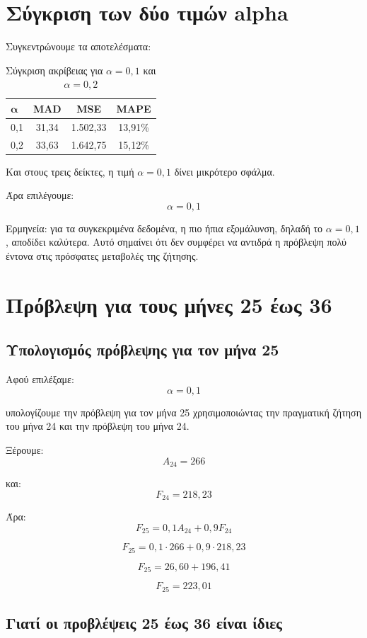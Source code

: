 \documentclass[12pt,a4paper]{article}
\begin{document}
\section{Σύγκριση των δύο τιμών alpha}

Συγκεντρώνουμε τα αποτελέσματα:

\begin{table}[H]
\centering
\caption{Σύγκριση ακρίβειας για \(\alpha=0{,}1\) και \(\alpha=0{,}2\)}
\begin{tabular}{lccc}
\toprule
\(\boldsymbol{\alpha}\) & \textbf{MAD} & \textbf{MSE} & \textbf{MAPE} \\
\midrule
0,1 & 31,34 & 1.502,33 & 13,91\% \\
0,2 & 33,63 & 1.642,75 & 15,12\% \\
\bottomrule
\end{tabular}
\end{table}

Και στους τρεις δείκτες, η τιμή \(\alpha=0{,}1\) δίνει μικρότερο σφάλμα.

Άρα επιλέγουμε:
\[
\boxed{\alpha=0{,}1}
\]

Ερμηνεία: για τα συγκεκριμένα δεδομένα, η πιο ήπια εξομάλυνση, δηλαδή το \(\alpha=0{,}1\), αποδίδει καλύτερα. Αυτό σημαίνει ότι δεν συμφέρει να αντιδρά η πρόβλεψη πολύ έντονα στις πρόσφατες μεταβολές της ζήτησης.

\section{Πρόβλεψη για τους μήνες 25 έως 36}

\subsection{Υπολογισμός πρόβλεψης για τον μήνα 25}

Αφού επιλέξαμε:
\[
\alpha=0{,}1
\]

υπολογίζουμε την πρόβλεψη για τον μήνα 25 χρησιμοποιώντας την πραγματική ζήτηση του μήνα 24 και την πρόβλεψη του μήνα 24.

Ξέρουμε:
\[
A_{24}=266
\]

και:
\[
F_{24}=218{,}23
\]

Άρα:
\[
F_{25}=0{,}1A_{24}+0{,}9F_{24}
\]

\[
F_{25}=0{,}1\cdot266+0{,}9\cdot218{,}23
\]

\[
F_{25}=26{,}60+196{,}41
\]

\[
\boxed{F_{25}=223{,}01}
\]

\subsection{Γιατί οι προβλέψεις 25 έως 36 είναι ίδιες}
\end{document}
